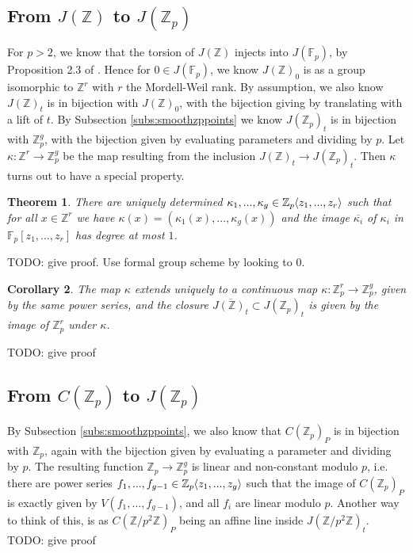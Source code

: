 \documentclass{article}
\newcommand{\Z}{\mathbb{Z}}
\newcommand{\F}{\mathbb{F}}
\renewcommand{\angle}[1]{\hspace{-2pt}\left\langle #1 \right\rangle}
\theoremstyle{plain}
\newtheorem{thm}{Theorem}[section] %
\newtheorem{cor}[thm]{Corollary} %
\theoremstyle{definition}
\theoremstyle{remark}
\begin{document}
\subsection{From \texorpdfstring{$J(\Z)$}{J(Z)} to \texorpdfstring{$J(\Z_p)$}{J(Z\_p)}}
For $p > 2$, we know that the torsion of $J(\Z)$ injects into $J(\F_p)$, by Proposition 2.3 of \cite{pierre2000}. Hence for $0 \in J(\F_p)$, we know $J(\Z)_0$ is as a group isomorphic to $\Z^r$ with $r$ the Mordell-Weil rank. By assumption, we also know $J(\Z)_t$ is in bijection with $J(\Z)_0$, with the bijection giving by translating with a lift of $t$. By Subsection \ref{subs:smoothzppoints} we know $J(\Z_p)_t$ is in bijection with $\Z_p^{g}$, with the bijection given by evaluating parameters and dividing by $p$. Let $\kappa: \Z^r \to \Z_p^g$ be the map resulting from the inclusion $J(\Z)_t \to J(\Z_p)_t$. Then $\kappa$ turns out to have a special property.

\begin{thm}
\label{thm:kappanice}
There are uniquely determined $\kappa_1,...,\kappa_g \in \Z_p\angle{z_1,...,z_r}$ such that for all $x \in \Z^r$ we have $\kappa(x) = (\kappa_1(x),...,\kappa_g(x))$ and the image $\overline{\kappa_i}$ of $\kappa_i$ in $\F_p[z_1,...,z_r]$ has degree at most $1$.
\end{thm}
TODO: give proof. Use formal group scheme by looking to 0.

\begin{cor}
\label{cor:closurejac}
The map $\kappa$ extends uniquely to a continuous map $\kappa: \Z_p^r \to \Z_p^g$, given by the same power series, and the closure $\overline{J(\Z)_t} \subset J(\Z_p)_t$ is given by the image of $\Z_p^r$ under $\kappa$.
\end{cor}
TODO: give proof

\subsection{From \texorpdfstring{$C(\Z_p)$}{C(Z\_p)} to \texorpdfstring{$J(\Z_p)$}{J(Z\_p)}}
By Subsection \ref{subs:smoothzppoints}, we also know that $C(\Z_p)_P$ is in bijection with $\Z_p$, again with the bijection given by evaluating a parameter and dividing by $p$. The resulting function $\Z_p \to \Z_p^g$ is linear and non-constant modulo $p$, i.e. there are power series $f_1,...,f_{g-1} \in \Z_p\angle{z_1,...,z_g}$ such that the image of $C(\Z_p)_P$ is exactly given by $V(f_1,...,f_{g-1})$, and all $f_i$ are linear modulo $p$. Another way to think of this, is as $C(\Z/p^2\Z)_P$ being an affine line inside $J(\Z/p^2\Z)_t$.
TODO: give proof
\end{document}
